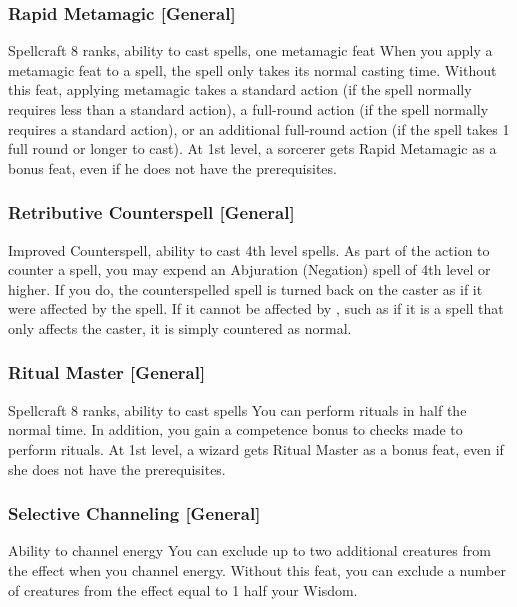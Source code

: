 \subsubsection{Rapid Metamagic [General]}
 Spellcraft 8 ranks, ability to cast spells, one metamagic feat
 When you apply a metamagic feat to a spell, the spell only takes its normal casting time.
 Without this feat, applying metamagic takes a standard action (if the spell normally requires less than a standard action), a full-round action (if the spell normally requires a standard action), or an additional full-round action (if the spell takes 1 full round or longer to cast).
 At 1st level, a sorcerer gets Rapid Metamagic as a bonus feat, even if he does not have the prerequisites.

\subsubsection{Retributive Counterspell [General]}
 Improved Counterspell, ability to cast 4th level spells.
 As part of the action to counter a spell, you may expend an Abjuration (Negation) spell of 4th level or higher. If you do, the counterspelled spell is turned back on the caster as if it were affected by the  spell. If it cannot be affected by , such as if it is a spell that only affects the caster, it is simply countered as normal.

\subsubsection{Ritual Master [General]}
 Spellcraft 8 ranks, ability to cast spells
 You can perform rituals in half the normal time. In addition, you gain a  competence bonus to checks made to perform rituals.
 At 1st level, a wizard gets Ritual Master as a bonus feat, even if she does not have the prerequisites.

\subsubsection{Selective Channeling [General]}
 Ability to channel energy
 You can exclude up to two additional creatures from the effect when you channel energy.
 Without this feat, you can exclude a number of creatures from the effect equal to 1 \add half your Wisdom.

